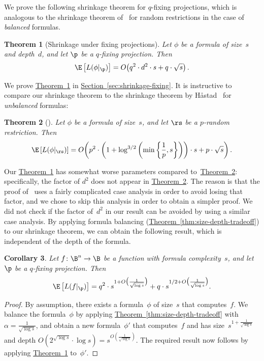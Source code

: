 \documentclass[11pt]{article}
\numberwithin{equation}{section}
\newtheorem{theorem}{Theorem}[section]
\newtheorem{corollary}[theorem]{Corollary}
\theoremstyle{definition}
\theoremstyle{plain}
\newcommand{\expref}[2]{\hyperref[#2]{#1~\ref{#2}}}
\theoremstyle{definition}\newtheorem{notation}[theorem]{Notation}\theoremstyle{plain}
\begin{document}
\noindent We prove the following shrinkage theorem for $q$-fixing
projections, which is analogous to the shrinkage theorem of~\cite{H98}
for random restrictions in the case of \emph{balanced} formulas. 
\begin{theorem}[Shrinkage under fixing projections]
\label{thm:shrinkage-fixing}Let $\phi$ be a formula of size~$s$ and
depth~$d$, and let $\p$ be a $q$-fixing projection. Then 
\[
\E\left[L(\phi|_{\p})\right]=O\!\left(q^{2}\cdot d^{2}\cdot s+q\cdot\sqrt{s}\right).
\]
\end{theorem}

\noindent We prove \expref{Theorem}{thm:shrinkage-fixing} in \expref{Section}{sec:shrinkage-fixing}.
It is instructive to compare our shrinkage theorem to the shrinkage
theorem by H{\aa}stad~\cite{H98} for \emph{unbalanced} formulas:
\begin{theorem}[\cite{H98}]
\label{thm:shrinkage-hastad}Let $\phi$ be a formula of size~$s$,
and let $\rs$ be a $p$-random restriction. Then
\[
\E\left[L(\phi|_{\rs})\right]=O\!\left(p^{2}\cdot\left(1+\log^{3/2}\left(\min\left\{ \frac{1}{p},s\right\} \right)\right)\cdot s+p\cdot\sqrt{s}\right).
\]
\end{theorem}

Our \expref{Theorem}{thm:shrinkage-fixing} has somewhat worse parameters compared
to~\expref{Theorem}{thm:shrinkage-hastad}: specifically, the factor of $d^{2}$
does not appear in \expref{Theorem}{thm:shrinkage-hastad}. The reason is that the
proof of~\cite{H98} uses a fairly complicated case analysis in order
to avoid losing that factor, and we chose to skip this analysis in
order to obtain a simpler proof. We did not check if the factor of~$d^{2}$
in our result can be avoided by using a similar case analysis. By
applying formula balancing (\expref{Theorem}{thm:size-depth-tradeoff}) to our shrinkage
theorem, we can obtain the following result, which is independent
of the depth of the formula. 
\begin{corollary}
\label{cor:shrinkage-without-depth-fixing}Let $f\colon\B^{n}\to\B$ be
a function with formula complexity~$s$, and let $\p$ be a $q$-fixing
projection. Then 
\[
\E\left[L(f|_{\p})\right]=q^{2}\cdot s^{1+O\bigl(\frac{1}{\sqrt{\log s}}\bigr)}+q\cdot s^{1/2+O\bigl(\frac{1}{\sqrt{\log s}}\bigr)}.
\]
\end{corollary}

\begin{proof}
By assumption, there exists a formula~$\phi$ of size~$s$ that
computes~$f$. We balance the formula~$\phi$ by applying 
\expref{Theorem}{thm:size-depth-tradeoff}
with $\alpha=\frac{1}{\sqrt{\log s}}$, and obtain a new formula~$\phi'$
that computes~$f$ and has size~$s^{1+\frac{1}{\sqrt{\log s}}}$
and depth $O(2^{\sqrt{\log s}}\cdot\log s)=s^{O(\frac{1}{\sqrt{\log s}})}$.
The required result now follows by applying \expref{Theorem}{thm:shrinkage-fixing}
to~$\phi'$.
\end{proof}
\end{document}

